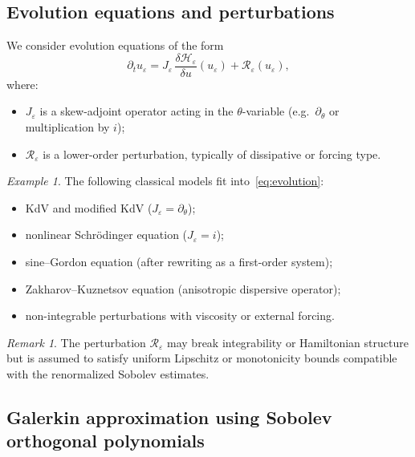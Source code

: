 \documentclass[11pt]{amsart}
\theoremstyle{plain}
\theoremstyle{definition}
\theoremstyle{remark}
\newtheorem{remark}[theorem]{Remark}
\theoremstyle{remark}
\newtheorem{example}[theorem]{Example}
\begin{document}
\subsection{Evolution equations and perturbations}

We consider evolution equations of the form
\begin{equation}
\label{eq:evolution}
\partial_t u_\varepsilon
=
J_\varepsilon\,\frac{\delta\mathcal H_\varepsilon}{\delta u}(u_\varepsilon)
+
\mathcal R_\varepsilon(u_\varepsilon),
\end{equation}
where:
\begin{itemize}
\item $J_\varepsilon$ is a skew-adjoint operator acting in the
$\theta$-variable (e.g.\ $\partial_\theta$ or multiplication by $i$);
\item $\mathcal R_\varepsilon$ is a lower-order perturbation, typically
of dissipative or forcing type.
\end{itemize}

\begin{example}
The following classical models fit into~\eqref{eq:evolution}:
\begin{itemize}
\item KdV and modified KdV ($J_\varepsilon=\partial_\theta$);
\item nonlinear Schr\"odinger equation ($J_\varepsilon=i$);
\item sine--Gordon equation (after rewriting as a first-order system);
\item Zakharov--Kuznetsov equation (anisotropic dispersive operator);
\item non-integrable perturbations with viscosity or external forcing.
\end{itemize}
\end{example}

\begin{remark}
The perturbation $\mathcal R_\varepsilon$ may break integrability or
Hamiltonian structure but is assumed to satisfy uniform Lipschitz or
monotonicity bounds compatible with the renormalized Sobolev estimates.
\end{remark}

\subsection{Galerkin approximation using Sobolev orthogonal polynomials}
\end{document}
